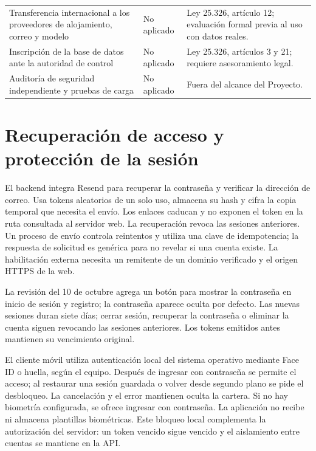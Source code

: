 \begin{table}[ht]
\begin{tabular}{>{\raggedright\arraybackslash}p{5.6cm}>{\raggedright\arraybackslash}p{1.9cm}>{\raggedright\arraybackslash}p{6.1cm}}
Transferencia internacional a los proveedores de alojamiento, correo y modelo & No aplicado & Ley 25.326, artículo 12; evaluación formal previa al uso con datos reales.\\
Inscripción de la base de datos ante la autoridad de control & No aplicado & Ley 25.326, artículos 3 y 21; requiere asesoramiento legal.\\
Auditoría de seguridad independiente y pruebas de carga & No aplicado & Fuera del alcance del Proyecto.\\\hline
\end{tabular}
\end{table}

\section{Recuperación de acceso y protección de la sesión}\label{sec:correo-cuenta}\label{sec:mejoras-octubre}

El backend integra Resend para recuperar la contraseña y verificar la dirección de correo. Usa tokens aleatorios de un solo uso, almacena su hash y cifra la copia temporal que necesita el envío. Los enlaces caducan y no exponen el token en la ruta consultada al servidor web. La recuperación revoca las sesiones anteriores. Un proceso de envío controla reintentos y utiliza una clave de idempotencia; la respuesta de solicitud es genérica para no revelar si una cuenta existe. La habilitación externa necesita un remitente de un dominio verificado y el origen HTTPS de la web.

La revisión del 10 de octubre agrega un botón para mostrar la contraseña en inicio de sesión y registro; la contraseña aparece oculta por defecto. Las nuevas sesiones duran siete días; cerrar sesión, recuperar la contraseña o eliminar la cuenta siguen revocando las sesiones anteriores. Los tokens emitidos antes mantienen su vencimiento original.

El cliente móvil utiliza autenticación local del sistema operativo mediante Face ID o huella, según el equipo. Después de ingresar con contraseña se permite el acceso; al restaurar una sesión guardada o volver desde segundo plano se pide el desbloqueo. La cancelación y el error mantienen oculta la cartera. Si no hay biometría configurada, se ofrece ingresar con contraseña. La aplicación no recibe ni almacena plantillas biométricas. Este bloqueo local complementa la autorización del servidor: un token vencido sigue vencido y el aislamiento entre cuentas se mantiene en la API.

